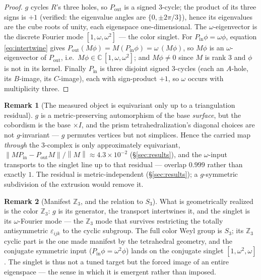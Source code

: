 \documentclass[11pt]{article}
\theoremstyle{definition}
\newtheorem{remark}{Remark}
\newcommand{\C}{\mathbb{C}}
\newcommand{\Z}{\mathbb{Z}}
\newcommand{\norm}[1]{\left\lVert #1 \right\rVert}
\newcommand{\Pin}{P_{\mathrm{in}}}
\newcommand{\Pout}{P_{\mathrm{out}}}
\begin{document}
\begin{proof}
$g$ cycles $R$'s three holes, so $\Pout$ is a signed $3$-cycle; the product of its
three signs is $+1$ (verified: the eigenvalue angles are $\{0,\pm2\pi/3\}$), hence its
eigenvalues are the cube roots of unity, each eigenspace one-dimensional. The
$\omega$-eigenvector is the discrete Fourier mode $[1,\omega,\omega^2]$ --- the color
singlet. For $\Pin\phi=\omega\phi$, equation \eqref{eq:intertwine} gives
$\Pout(M\phi)=M(\Pin\phi)=\omega\,(M\phi)$, so $M\phi$ is an $\omega$-eigenvector of
$\Pout$, i.e.\ $M\phi\in\C\,[1,\omega,\omega^2]$; and $M\phi\neq0$ since $M$ is rank
$3$ and $\phi$ is not in its kernel. Finally $\Pin$ is three disjoint signed $3$-cycles
(each an $A$-hole, its $B$-image, its $C$-image), each with sign-product $+1$, so
$\omega$ occurs with multiplicity three.
\end{proof}

\begin{remark}[The measured object is equivariant only up to a triangulation residual]
\label{rem:residual}
$g$ is a metric-preserving automorphism of the base \emph{surface}, but the cobordism
is the base $\times I$, and the prism tetrahedralization's diagonal choices are not
$g$-invariant --- $g$ permutes vertices but not simplices. Hence the carried map
\emph{through} the $3$-complex is only approximately equivariant,
$\norm{M\Pin-\Pout M}/\norm{M}\approx 4.3\times10^{-2}$ (\S\ref{sec:results}), and the
$\omega$-input transports to the singlet line up to that residual --- overlap $0.999$
rather than exactly $1$. The residual is metric-independent (\S\ref{sec:results}); a
$g$-symmetric subdivision of the extrusion would remove it.
\end{remark}

\begin{remark}[Manifest $\Z_3$, and the relation to $S_3$]
\label{rem:z3}
What is geometrically realized is the color $\Z_3$: $g$ is its generator, the transport
intertwines it, and the singlet is its $\omega$-Fourier mode --- the $\Z_3$ mode that
survives restricting the totally antisymmetric $\varepsilon_{ijk}$ to the cyclic
subgroup. The full color Weyl group is $S_3$; its $\Z_3$ cyclic part is the one made
manifest by the tetrahedral geometry, and the conjugate symmetric input
($\Pin\phi=\omega^2\phi$) lands on the conjugate singlet $[1,\omega^2,\omega]$. The
singlet is thus not a tuned target but the forced image of an entire eigenspace --- the
sense in which it is emergent rather than imposed.
\end{remark}
\end{document}
